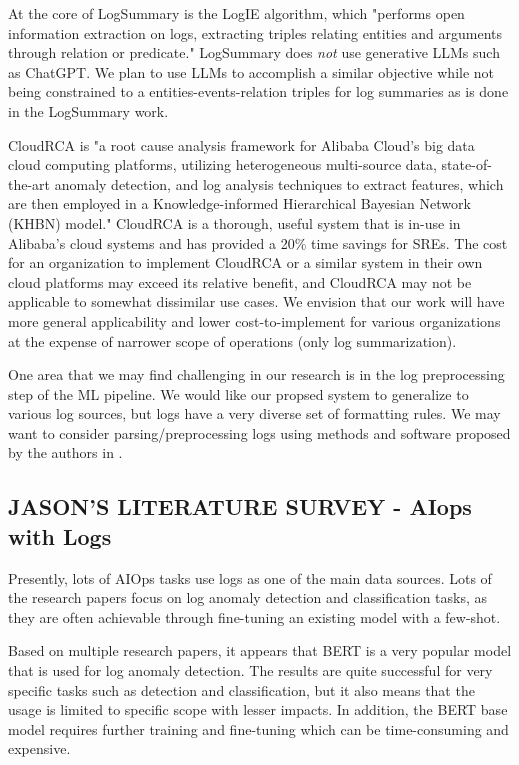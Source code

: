 \documentclass[conference]{IEEEtran}
\begin{document}
At the core of LogSummary is the LogIE algorithm, which "performs open information extraction on logs, extracting triples relating entities and arguments through relation or predicate." \cite{10017337} LogSummary does \textit{not} use generative LLMs such as ChatGPT. We plan to use LLMs to accomplish a similar objective while not being constrained to a entities-events-relation triples for log summaries as is done in the LogSummary work.

CloudRCA is "a root cause analysis framework for Alibaba Cloud's big data cloud computing platforms, utilizing heterogeneous multi-source data, state-of-the-art anomaly detection, and log analysis techniques to extract features, which are then employed in a Knowledge-informed Hierarchical Bayesian Network (KHBN) model." \cite{10.1145/3459637.3481903} CloudRCA is a thorough, useful system that is in-use in Alibaba's cloud systems and has provided a 20\% time savings for SREs. The cost for an organization to implement CloudRCA or a similar system in their own cloud platforms may exceed its relative benefit, and CloudRCA may not be applicable to somewhat dissimilar use cases. We envision that our work will have more general applicability and lower cost-to-implement for various organizations at the expense of narrower scope of operations (only log summarization).

One area that we may find challenging in our research is in the log preprocessing step of the ML pipeline. We would like our propsed system to generalize to various log sources, but logs have a very diverse set of formatting rules. We may want to consider parsing/preprocessing logs using methods and software proposed by the authors in \cite{10.1145/3540250.3558947}.

\subsection{JASON'S LITERATURE SURVEY - AIops with Logs}
Presently, lots of AIOps tasks use logs as one of the main data sources. Lots of the research papers focus on log anomaly detection and classification tasks, as they are often achievable through fine-tuning an existing model with a few-shot. 

Based on multiple research papers, it appears that BERT is a very popular model that is used for log anomaly detection. The results are quite successful for very specific tasks such as detection and classification, but it also means that the usage is limited to specific scope with lesser impacts. In addition, the BERT base model requires further training and fine-tuning which can be time-consuming and expensive. \cite{LEE2023110689}
\end{document}
